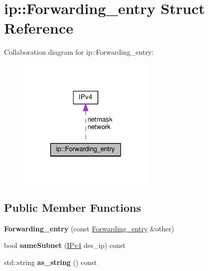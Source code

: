 \hypertarget{structip_1_1Forwarding__entry}{}\section{ip\+:\+:Forwarding\+\_\+entry Struct Reference}
\label{structip_1_1Forwarding__entry}


Collaboration diagram for ip\+:\+:Forwarding\+\_\+entry\+:
\nopagebreak
\begin{figure}[H]
\begin{center}
\leavevmode
\includegraphics[width=185pt]{structip_1_1Forwarding__entry__coll__graph}
\end{center}
\end{figure}
\subsection*{Public Member Functions}
\begin{DoxyCompactItemize}
\item 
{\bfseries Forwarding\+\_\+entry} (const \hyperlink{structip_1_1Forwarding__entry}{Forwarding\+\_\+entry} \&other)\hypertarget{structip_1_1Forwarding__entry_a9cdd6c01091d718a32a11342c3998f9f}{}\label{structip_1_1Forwarding__entry_a9cdd6c01091d718a32a11342c3998f9f}

\item 
bool {\bfseries same\+Subnet} (\hyperlink{structIPv4}{I\+Pv4} des\+\_\+ip) const \hypertarget{structip_1_1Forwarding__entry_a15177e8af63ffd9d41a72a55abfcbb58}{}\label{structip_1_1Forwarding__entry_a15177e8af63ffd9d41a72a55abfcbb58}

\item 
std\+::string {\bfseries as\+\_\+string} () const \hypertarget{structip_1_1Forwarding__entry_a7b005eaf733338c728b9e63c00a84668}{}\label{structip_1_1Forwarding__entry_a7b005eaf733338c728b9e63c00a84668}

\end{DoxyCompactItemize}
